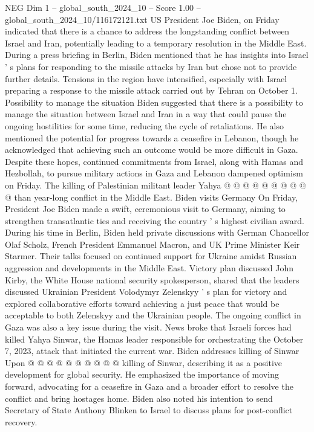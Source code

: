 \begin{textsample}{NEG Dim 1 – global\_south\_2024\_10 – Score 1.00 – global\_south\_2024\_10/116172121.txt}  \label{ex:f1_neg_285}
US President Joe Biden, on Friday indicated that there is a chance to address the longstanding conflict between Israel and Iran, potentially leading to a temporary resolution in the Middle East.
During a press briefing in Berlin, Biden mentioned that he has insights into Israel ' s plans for responding to the missile attacks by Iran but chose not to provide further details.
Tensions in the region have intensified, especially with Israel preparing a response to the missile attack carried out by Tehran on October 1.
Possibility to manage the situation Biden suggested that there is a possibility to manage the situation between Israel and Iran in a way that could pause the ongoing hostilities for some time, reducing the cycle of retaliations.
He also mentioned the potential for progress towards a ceasefire in Lebanon, though he acknowledged that achieving such an outcome would be more difficult in Gaza.
Despite these hopes, continued commitments from Israel, along with Hamas and Hezbollah, to pursue military actions in Gaza and Lebanon dampened optimism on Friday.
The killing of Palestinian militant leader Yahya @ @ @ @ @ @ @ @ @ @ than year-long conflict in the Middle East.
Biden visits Germany On Friday, President Joe Biden made a swift, ceremonious visit to Germany, aiming to strengthen transatlantic ties and receiving the country ' s highest civilian award.
During his time in Berlin, Biden held private discussions with German Chancellor Olaf Scholz, French President Emmanuel Macron, and UK Prime Minister Keir Starmer.
Their talks focused on continued support for Ukraine amidst Russian aggression and developments in the Middle East.
Victory plan discussed John Kirby, the White House national security spokesperson, shared that the leaders discussed Ukrainian President Volodymyr Zelenskyy ' s plan for victory and explored collaborative efforts toward achieving a just peace that would be acceptable to both Zelenskyy and the Ukrainian people.
The ongoing conflict in Gaza was also a key issue during the visit.
News broke that Israeli forces had killed Yahya Sinwar, the Hamas leader responsible for orchestrating the October 7, 2023, attack that initiated the current war.
Biden addresses killing of Sinwar Upon @ @ @ @ @ @ @ @ @ @ killing of Sinwar, describing it as a positive development for global security.
He emphasized the importance of moving forward, advocating for a ceasefire in Gaza and a broader effort to resolve the conflict and bring hostages home.
Biden also noted his intention to send Secretary of State Anthony Blinken to Israel to discuss plans for post-conflict recovery.

\end{textsample}
